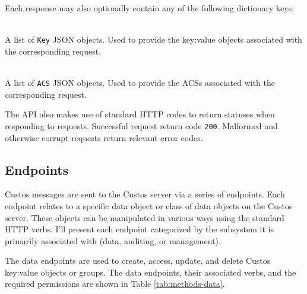 \noindent
Each response may also optionally contain any of the following
dictionary keys:

\begin{packed_desc}
\item[\texttt{Keys}] \hfill \\ A list of \texttt{Key} JSON
  objects. Used to provide the key:value objects associated with the
  corresponding request.
\item[\texttt{ACSs}] \hfill \\ A list of \texttt{ACS} JSON
  objects. Used to provide the ACSs associated with the corresponding
  request.
\end{packed_desc}

The API also makes use of standard HTTP codes to return statuses when
responding to requests. Successful request return code
\texttt{200}. Malformed and otherwise corrupt requests return relevant
error codes.

\subsection{Endpoints}

Custos messages are sent to the Custos server via a series of
endpoints. Each endpoint relates to a specific data object or class
of data objects on the Custos server. These objects can be manipulated
in various ways using the standard HTTP verbs. I'll present each
endpoint categorized by the subsystem it is primarily associated with
(data, auditing, or management).

The data endpoints are used to create, access, update, and delete
Custos key:value objects or groups. The data endpoints, their
associated verbs, and the required permissions are shown in Table
\ref{tab:methods-data}.

